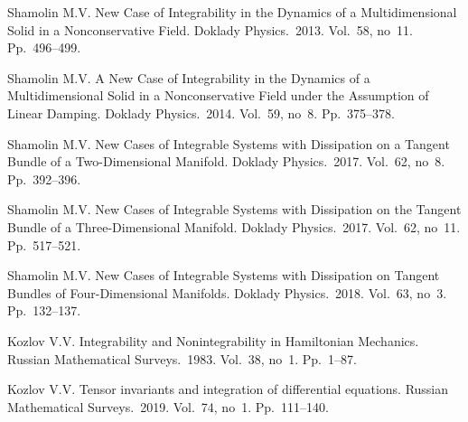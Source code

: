 \documentclass[12pt]{llncs}
\begin{document}
\begin{thebibliography}{9} %
 Shamolin M.V. New Case of Integrability in the Dynamics of a Multidimensional Solid in a Nonconservative Field. Doklady Physics.~2013. Vol.~58, no~11. Pp.~496--499.

  Shamolin M.V. A New Case of Integrability in the Dynamics of a Multidimensional Solid in a Nonconservative Field under the Assumption of Linear Damping. Doklady Physics.~2014. Vol.~59, no~8. Pp.~375--378.

 Shamolin M.V. New Cases of Integrable Systems with Dissipation on a Tangent Bundle of a Two-Dimensional Manifold. Doklady Physics.~2017. Vol.~62, no~8. Pp.~392--396.

  Shamolin M.V. New Cases of Integrable Systems with Dissipation on the Tangent Bundle of a Three-Dimensional Manifold. Doklady Physics.~2017. Vol.~62, no~11. Pp.~517--521.

 Shamolin M.V. New Cases of Integrable Systems with Dissipation on Tangent Bundles of Four-Dimensional Manifolds. Doklady Physics.~2018. Vol.~63, no~3. Pp.~132--137.

 Kozlov V.V. Integrability and Nonintegrability in Hamiltonian Mechanics. Russian Mathematical Surveys.~1983. Vol.~38, no~1. Pp.~1--87.

 Kozlov V.V. Tensor invariants and integration of differential equations. Russian Mathematical Surveys.~2019. Vol.~74, no~1. Pp.~111--140.







\end{thebibliography}

\end{document}

